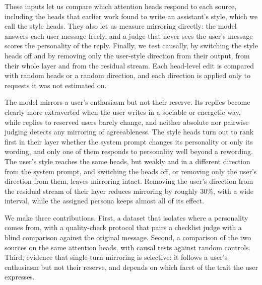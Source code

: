These inputs let us compare which attention heads respond to each source, including the heads that earlier work found to write an assistant's style, which we call the style heads. They also let us measure mirroring directly: the model answers each user message freely, and a judge that never sees the user's message scores the personality of the reply. Finally, we test causally, by switching the style heads off and by removing only the user-style direction from their output, from their whole layer and from the residual stream. Each head-level edit is compared with random heads or a random direction, and each direction is applied only to requests it was not estimated on.

The model mirrors a user's enthusiasm but not their reserve. Its replies become clearly more extraverted when the user writes in a sociable or energetic way, while replies to reserved users barely change, and neither absolute nor pairwise judging detects any mirroring of agreeableness. The style heads turn out to rank first in their layer whether the system prompt changes its personality or only its wording, and only one of them responds to personality well beyond a rewording. The user's style reaches the same heads, but weakly and in a different direction from the system prompt, and switching the heads off, or removing only the user's direction from them, leaves mirroring intact. Removing the user's direction from the residual stream of their layer reduces mirroring by roughly 30\%, with a wide interval, while the assigned persona keeps almost all of its effect.

We make three contributions. First, a dataset that isolates where a personality comes from, with a quality-check protocol that pairs a checklist judge with a blind comparison against the original message. Second, a comparison of the two sources on the same attention heads, with causal tests against random controls. Third, evidence that single-turn mirroring is selective: it follows a user's enthusiasm but not their reserve, and depends on which facet of the trait the user expresses.
